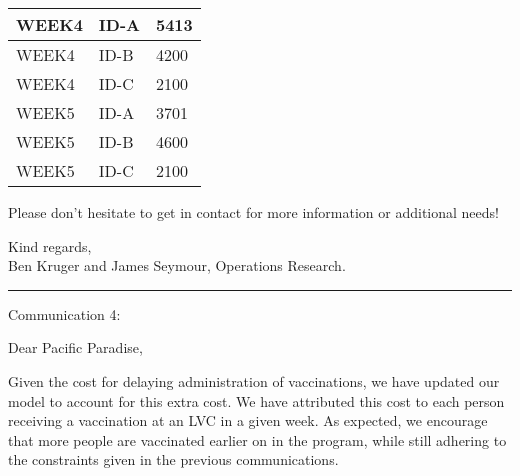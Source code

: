 \documentclass[12pt]{article}
\begin{document}
{\begin{center}
\begin{table}[H]
\begin{tabular}{|l|l|l|}
            WEEK4                               & ID-A                             & 5413                                                \\ \hline
            WEEK4                               & ID-B                             & 4200                                                \\ \hline
            WEEK4                               & ID-C                             & 2100                                                \\ \hline
            WEEK5                               & ID-A                             & 3701                                                \\ \hline
            WEEK5                               & ID-B                             & 4600                                                \\ \hline
            WEEK5                               & ID-C                             & 2100                                                \\ \hline
            \end{tabular}
            \end{table}
    \end{center}
    Please don't hesitate to get in contact for more information or additional needs!
    
    Kind regards,\\
    Ben Kruger and James Seymour, Operations Research.\\
    \hrule
    
    Communication 4:
    
    Dear Pacific Paradise,
    
    Given the cost for delaying administration of vaccinations, we have updated our model to account for this extra cost. We have attributed this cost to each person receiving a vaccination at an LVC in a given week. As expected, we encourage that more people are vaccinated earlier on in the program, while still adhering to the constraints given in the previous communications.

}
\end{document}
